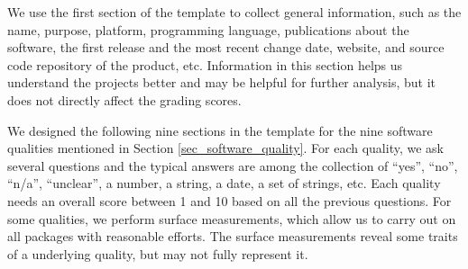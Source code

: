 We use the first section of the template to collect general information, such as the name, purpose, platform, programming language, publications about the software, the first release and the most recent change date, website, and source code repository of the product, etc. Information in this section helps us understand the projects better and may be helpful for further analysis, but it does not directly affect the grading scores.

We designed the following nine sections in the template for the nine software qualities mentioned in Section \ref{sec_software_quality}. For each quality, we ask several questions and the typical answers are among the collection of ``yes'', ``no'', ``n/a'', ``unclear'', a number, a string, a date, a set of strings, etc. Each quality needs an overall score between 1 and 10 based on all the previous questions. For some qualities, we perform surface measurements, which allow us to carry out on all packages with reasonable efforts. The surface measurements reveal some traits of a underlying quality, but may not fully represent it.

